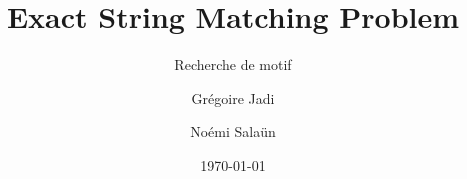 \documentclass[handout]{beamer}
\begin{document}
\title{Exact String Matching Problem}
\subtitle{Recherche de motif}

\author{Grégoire Jadi \and{} Noémi Salaün}
\date{\today}
\end{document}
